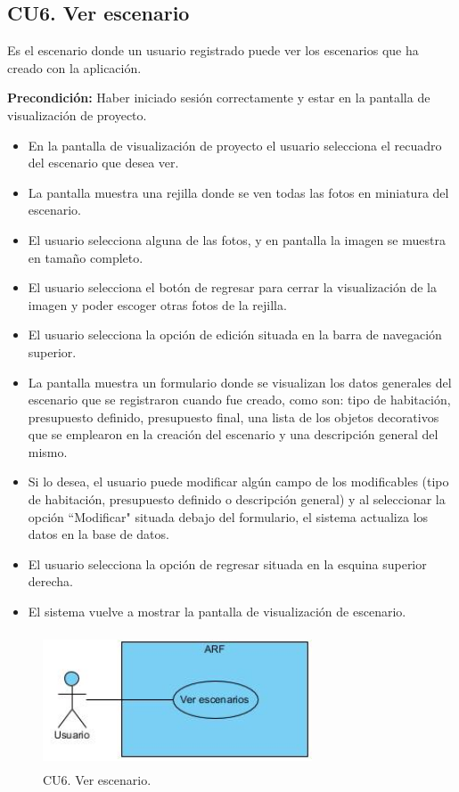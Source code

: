 \subsection{CU6. Ver escenario}\par
Es el escenario donde un usuario registrado puede ver los escenarios que ha creado con la aplicación.\par
\textbf{Precondición:} Haber iniciado sesión correctamente y estar en la pantalla de visualización de proyecto.\par
\begin{itemize}
	\item En la pantalla de visualización de proyecto el usuario selecciona el recuadro del escenario que desea ver.
	\item La pantalla muestra una rejilla donde se ven todas las fotos en miniatura del escenario.
	\item El usuario selecciona alguna de las fotos, y en pantalla la imagen se muestra en tamaño completo.
	\item El usuario selecciona el botón de regresar para cerrar la visualización de la imagen y poder escoger otras fotos de la rejilla.
	\item El usuario selecciona la opción de edición situada en la barra de navegación superior.
	\item La pantalla muestra un formulario donde se visualizan los datos generales del escenario que se registraron cuando fue creado, como son: tipo de habitación, presupuesto definido, presupuesto final, una lista de los objetos decorativos que se emplearon en la creación del escenario y una descripción general del mismo.
	\item Si lo desea, el usuario puede modificar algún campo de los modificables (tipo de habitación, presupuesto definido o descripción general) y al seleccionar la opción ``Modificar" situada debajo del formulario, el sistema actualiza los datos en la base de datos.
	\item El usuario selecciona la opción de regresar situada en la esquina superior derecha.
	\item El sistema vuelve a mostrar la pantalla de visualización de escenario.
\end{itemize}

\begin{figure}[!htbp]
	\centering
	\includegraphics[width=8cm,height=4cm]{imagenes/analisis/cu/ver_escenarios.jpg}
	\caption{CU6. Ver escenario.}
	\label{fig:verescenario}
\end{figure} 

